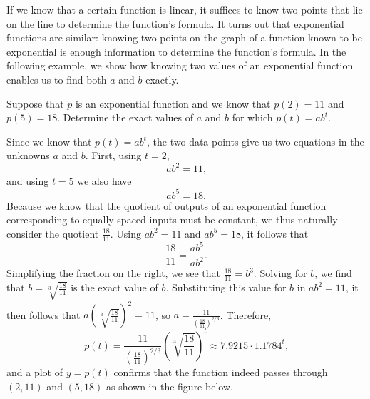 \documentclass[nooutcomes]{ximera}
\begin{document}
If we know that a certain function is linear, it suffices to know two points that lie on the line to determine the function's formula.  It turns out that exponential functions are similar:  knowing two points on the graph of a function known to be exponential is enough information to determine the function's formula.  In the following example, we show how knowing two values of an exponential function enables us to find both \(a\) and \(b\) exactly.

\begin{example}\label{example:exp1}
Suppose that \(p\) is an exponential function and we know that \(p(2) = 11\) and \(p(5) = 18\).  Determine the exact values of \(a\) and \(b\) for which \(p(t) = ab^t\).
\begin{explanation}
Since we know that \(p(t) = ab^t\), the two data points give us two equations in the unknowns \(a\) and \(b\).  First, using \(t = 2\),%
\begin{equation}
ab^2 = 11\text{,}
\end{equation}
and using \(t = 5\) we also have%
\begin{equation}
ab^5 = 18\text{.}
\end{equation}
Because we know that the quotient of outputs of an exponential function corresponding to equally-spaced inputs must be constant, we thus naturally consider the quotient \(\frac{18}{11}\).  Using $ab^2 = 11$ and $ab^5 = 18$, it follows that%
\begin{equation*}
\frac{18}{11} = \frac{ab^5}{ab^2}\text{.}
\end{equation*}
Simplifying the fraction on the right, we see that \(\frac{18}{11} = b^3\). Solving for \(b\), we find that \(b = \sqrt[3]{\frac{18}{11}}\) is the exact value of \(b\).  Substituting this value for \(b\) in $ab^2 = 11$, it then follows that \(a \left( \sqrt[3]{\frac{18}{11}} \right)^2 = 11\), so \(a = \frac{11}{\left( \frac{18}{11} \right)^{2/3}}\).  Therefore,%
\begin{equation*}
p(t) = \frac{11}{\left( \frac{18}{11} \right)^{2/3}} \left( \sqrt[3]{\frac{18}{11}} \right)^t \approx 7.9215 \cdot 1.1784^t\text{,}
\end{equation*}
and a plot of \(y = p(t)\) confirms that the function indeed passes through \((2,11)\) and \((5,18)\) as shown in the figure below.


\end{explanation}
\end{example}
\end{document}
